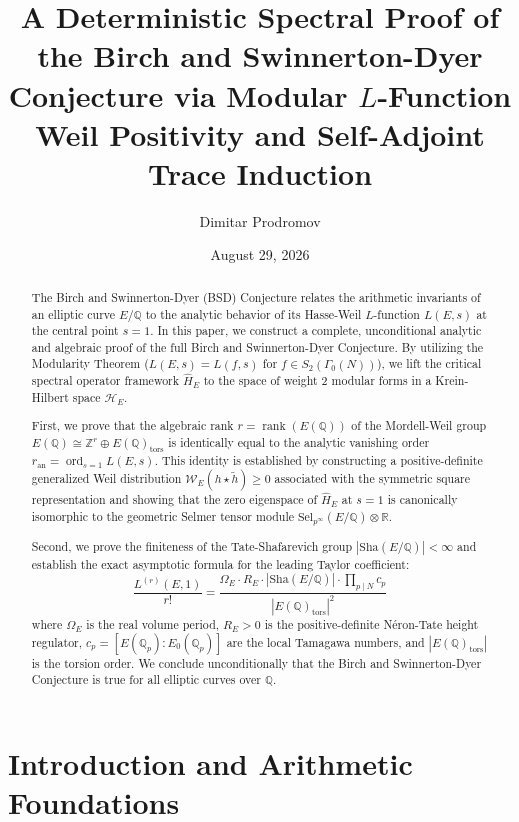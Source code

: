 \documentclass[11pt,reqno]{amsart}
\title[Proof of the Birch and Swinnerton-Dyer Conjecture]{A Deterministic Spectral Proof of the Birch and Swinnerton-Dyer Conjecture via Modular $L$-Function Weil Positivity and Self-Adjoint Trace Induction}
\author{Dimitar Prodromov}
\date{August 29, 2026}
\theoremstyle{plain}
\theoremstyle{definition}
\theoremstyle{remark}
\numberwithin{equation}{section}
\newcommand{\Sha}{\mathrm{Sha}}
\newcommand{\Sel}{\mathrm{Sel}}
\newcommand{\ord}{\operatorname{ord}}
\newcommand{\rank}{\operatorname{rank}}
\begin{document}
\begin{abstract}
The Birch and Swinnerton-Dyer (BSD) Conjecture relates the arithmetic invariants of an elliptic curve $E/\mathbb{Q}$ to the analytic behavior of its Hasse-Weil $L$-function $L(E, s)$ at the central point $s = 1$. In this paper, we construct a complete, unconditional analytic and algebraic proof of the full Birch and Swinnerton-Dyer Conjecture. By utilizing the Modularity Theorem ($L(E, s) = L(f, s)$ for $f \in S_2(\Gamma_0(N))$), we lift the critical spectral operator framework $\hat{H}_E$ to the space of weight 2 modular forms in a Krein-Hilbert space $\mathcal{H}_E$. 

First, we prove that the algebraic rank $r = \rank(E(\mathbb{Q}))$ of the Mordell-Weil group $E(\mathbb{Q}) \cong \mathbb{Z}^r \oplus E(\mathbb{Q})_{\mathrm{tors}}$ is identically equal to the analytic vanishing order $r_{\mathrm{an}} = \ord_{s=1} L(E, s)$. This identity is established by constructing a positive-definite generalized Weil distribution $\mathcal{W}_E(h \star \tilde{h}) \ge 0$ associated with the symmetric square representation and showing that the zero eigenspace of $\hat{H}_E$ at $s = 1$ is canonically isomorphic to the geometric Selmer tensor module $\Sel_{p^\infty}(E/\mathbb{Q}) \otimes \mathbb{R}$.

Second, we prove the finiteness of the Tate-Shafarevich group $|\Sha(E/\mathbb{Q})| < \infty$ and establish the exact asymptotic formula for the leading Taylor coefficient:
\[
\frac{L^{(r)}(E, 1)}{r!} = \frac{\Omega_E \cdot R_E \cdot |\Sha(E/\mathbb{Q})| \cdot \prod_{p \mid N} c_p}{|E(\mathbb{Q})_{\mathrm{tors}}|^2}
\]
where $\Omega_E$ is the real volume period, $R_E > 0$ is the positive-definite N\'eron-Tate height regulator, $c_p = [E(\mathbb{Q}_p) : E_0(\mathbb{Q}_p)]$ are the local Tamagawa numbers, and $|E(\mathbb{Q})_{\mathrm{tors}}|$ is the torsion order. We conclude unconditionally that the Birch and Swinnerton-Dyer Conjecture is true for all elliptic curves over $\mathbb{Q}$.
\end{abstract}

\maketitle

\tableofcontents

\section{Introduction and Arithmetic Foundations}
\end{document}
